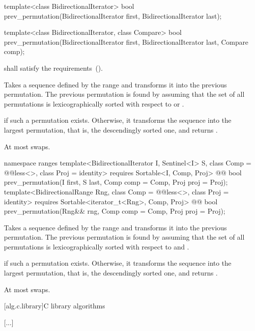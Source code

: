 %
\begin{itemdecl}
template<class BidirectionalIterator>
  bool prev_permutation(BidirectionalIterator first,
                        BidirectionalIterator last);

template<class BidirectionalIterator, class Compare>
  bool prev_permutation(BidirectionalIterator first,
                        BidirectionalIterator last, Compare comp);
\end{itemdecl}

\begin{itemdescr}
\pnum
\requires
{} shall satisfy the
 requirements~().

\pnum
\effects
Takes a sequence defined by the range
and transforms it into the previous permutation.
The previous permutation is found by assuming that the set of all permutations is
lexicographically sorted with respect to
or .

\pnum
\returns
{}
if such a permutation exists.
Otherwise, it transforms the sequence into the largest permutation,
that is, the descendingly sorted one, and returns
.

\pnum
\complexity
At most
swaps.
\end{itemdescr}

\begin{addedblock}
%
\begin{itemdecl}
namespace ranges {
  template<BidirectionalIterator I, Sentinel<I> S, class Comp = @@less<>,
      class Proj = identity>
    requires Sortable<I, Comp, Proj>
    @@ bool
      prev_permutation(I first, S last, Comp comp = Comp{}, Proj proj = Proj{});
  template<BidirectionalRange Rng, class Comp = @@less<>,
      class Proj = identity>
    requires Sortable<iterator_t<Rng>, Comp, Proj>
    @@ bool
      prev_permutation(Rng&& rng, Comp comp = Comp{}, Proj proj = Proj{});
}
\end{itemdecl}

\begin{itemdescr}
\pnum
\effects
Takes a sequence defined by the range
and transforms it into the previous permutation.
The previous permutation is found by assuming that the set of all permutations is
lexicographically sorted with respect to
 and .

\pnum
\returns
{}
if such a permutation exists.
Otherwise, it transforms the sequence into the largest permutation,
that is, the descendingly sorted one, and returns
.

\pnum
\complexity
At most
swaps.
\end{itemdescr}
\end{addedblock}

[alg.c.library]{C library algorithms}

[...]
